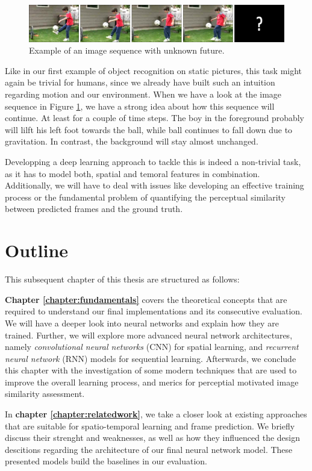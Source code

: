 \begin{figure}[htpb]
	\centering
	\includegraphics[scale=0.25]{figures/ucf-intro/serie1.png} 
	\caption{Example of an image sequence with unknown future.} \label{fig:intro-seq}
\end{figure}

Like in our first example of object recognition on static pictures, this task might again be trivial for humans, since we already have built such an intuition regarding motion and our environment. When we have a look at the image sequence in Figure \ref{fig:intro-seq}, we have a strong idea about how this sequence will continue. At least for a couple of time steps. The boy in the foreground probably will lilft his left foot towards the ball, while ball continues to fall down due to gravitation. In contrast, the background will stay almost unchanged.

Developping a deep learning approach to tackle this is indeed a non-trivial task, as it has to model both, spatial and temoral features in combination. Additionally, we will have to deal with issues like developing an effective training process or the fundamental problem of quantifying the perceptual similarity between predicted frames and the ground truth.


\section{Outline}

This subsequent chapter of this thesis are structured as follows:

\textbf{Chapter \ref{chapter:fundamentals}} covers the theoretical concepts that are required to understand our final implementations and its consecutive evaluation. We will have a deeper look into neural networks and explain how they are trained. Further, we will explore more advanced neural network architectures, namely \textit{convolutional neural networks} (CNN) for spatial learning, and \textit{recurrent neural network} (RNN) models for sequential learning. Afterwards, we conclude this chapter with the investigation of some modern techniques that are used to improve the overall learning process, and merics for perceptial motivated image similarity assessment.

In \textbf{chapter \ref{chapter:relatedwork}}, we take a closer look at existing approaches that are suitable for spatio-temporal learning and frame prediction. We briefly discuss their strenght and weaknesses, as well as how they influenced the design descitions regarding the architecture of our final neural network model. These presented models build the baselines in our evaluation.

